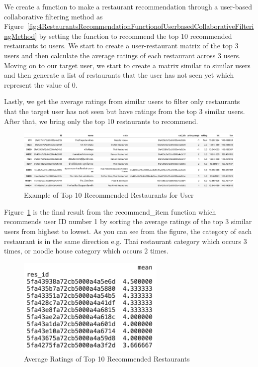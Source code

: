 \documentclass[12pt,oneside,openright,a4paper]{cpe-english-project}
\begin{document}
We create a function to make a restaurant recommendation through a user-based collaborative filtering method as Figure~\ref{fig:4RestaurantsRecommendationFunctionofUserbasedCollaborativeFilteringMethod} by setting the function to recommend the top 10 recommended restaurants to users. We start to create a user-restaurant matrix of the top 3 users and then calculate the average ratings of each restaurant across 3 users. Moving on to our target user, we start to create a matrix similar to similar users and then generate a list of restaurants that the user has not seen yet which represent the value of 0.

Lastly, we get the average ratings from similar users to filter only restaurants that the target user has not seen but have ratings from the top 3 similar users. After that, we bring only the top 10 restaurants to recommend.

\begin{figure}[H]\centering
\includegraphics[width=350pt]{./images/4ExampleofTop10RecommendedRestaurantsforUser.png}
\caption{Example of Top 10 Recommended Restaurants for User}\label{fig:4ExampleofTop10RecommendedRestaurantsforUser}
\end{figure}\vspace{-24pt}

Figure~\ref{fig:4ExampleofTop10RecommendedRestaurantsforUser} is the final result from the recommend\_item function which recommends user ID number 1 by sorting the average ratings of the top 3 similar users from highest to lowest. As you can see from the figure, the category of each restaurant is in the same direction e.g. Thai restaurant category which occurs 3 times, or noodle house category which occurs 2 times.

\begin{figure}[H]\centering
\includegraphics[width=200pt]{./images/4AverageRatingsofTop10RecommendedRestaurants.png}
\caption{Average Ratings of Top 10 Recommended Restaurants}\label{fig:4AverageRatingsofTop10RecommendedRestaurants}
\end{figure}\vspace{-24pt}
\end{document}
